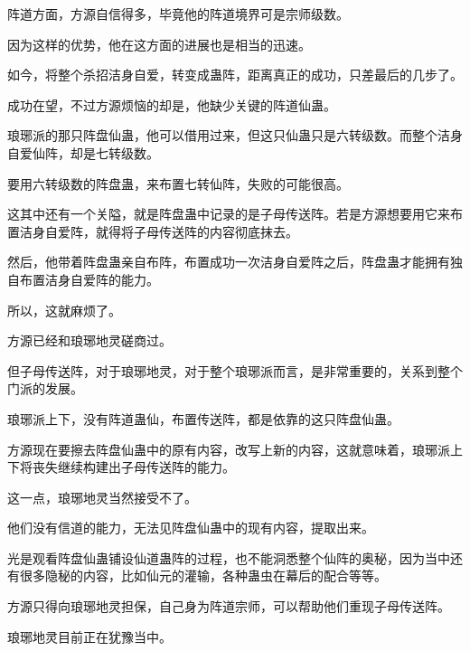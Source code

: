 \begin{this_body}
阵道方面，方源自信得多，毕竟他的阵道境界可是宗师级数。

因为这样的优势，他在这方面的进展也是相当的迅速。

如今，将整个杀招洁身自爱，转变成蛊阵，距离真正的成功，只差最后的几步了。

成功在望，不过方源烦恼的却是，他缺少关键的阵道仙蛊。

琅琊派的那只阵盘仙蛊，他可以借用过来，但这只仙蛊只是六转级数。而整个洁身自爱仙阵，却是七转级数。

要用六转级数的阵盘蛊，来布置七转仙阵，失败的可能很高。

这其中还有一个关隘，就是阵盘蛊中记录的是子母传送阵。若是方源想要用它来布置洁身自爱阵，就得将子母传送阵的内容彻底抹去。

然后，他带着阵盘蛊亲自布阵，布置成功一次洁身自爱阵之后，阵盘蛊才能拥有独自布置洁身自爱阵的能力。

所以，这就麻烦了。

方源已经和琅琊地灵磋商过。

但子母传送阵，对于琅琊地灵，对于整个琅琊派而言，是非常重要的，关系到整个门派的发展。

琅琊派上下，没有阵道蛊仙，布置传送阵，都是依靠的这只阵盘仙蛊。

方源现在要擦去阵盘仙蛊中的原有内容，改写上新的内容，这就意味着，琅琊派上下将丧失继续构建出子母传送阵的能力。

这一点，琅琊地灵当然接受不了。

他们没有信道的能力，无法见阵盘仙蛊中的现有内容，提取出来。

光是观看阵盘仙蛊铺设仙道蛊阵的过程，也不能洞悉整个仙阵的奥秘，因为当中还有很多隐秘的内容，比如仙元的灌输，各种蛊虫在幕后的配合等等。

方源只得向琅琊地灵担保，自己身为阵道宗师，可以帮助他们重现子母传送阵。

琅琊地灵目前正在犹豫当中。

\end{this_body}

